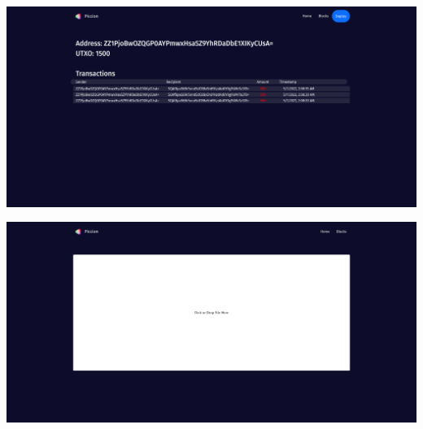 \documentclass[../documentation.tex]{subfiles}
\begin{document}

\includegraphics[width=\textwidth]{images/website4}


\includegraphics[width=\textwidth]{images/website5.png}
\end{document}

